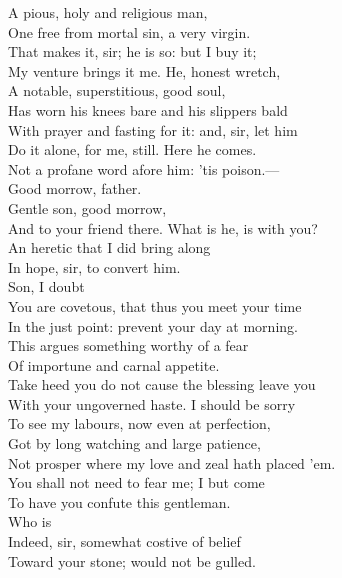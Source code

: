 \documentclass[a4paper,oneside,12pt]{memoir}
\begin{document}
\begin{drama*}
A pious, holy and religious man,\\
One free from mortal sin, a very virgin.\\
\mammonspeaks That makes it, sir; he is so: but I buy it;\\
My venture brings it me. He, honest wretch,\\
A notable, superstitious, good soul,\\
Has worn his knees bare and his slippers bald\\
With prayer and fasting for it: and, sir, let him\\
Do it alone, for me, still. Here he comes.\\
Not a profane word afore him: 'tis poison.---\\
Good morrow, father.\\
\subtlespeaks {} Gentle son, good morrow,\\
And to your friend there. What is he, is with you?\\
\mammonspeaks An heretic that I did bring along\\
In hope, sir, to convert him.\\
\subtlespeaks {} Son, I doubt\\
You are covetous, that thus you meet your time\\
In the just point: prevent your day at morning.\\
This argues something worthy of a fear\\
Of importune and carnal appetite.\\
Take heed you do not cause the blessing leave you\\
With your ungoverned haste. I should be sorry\\
To see my labours, now even at perfection,\\
Got by long watching and large patience,\\
Not prosper where my love and zeal hath placed 'em.\\
\mammonspeaks You shall not need to fear me; I but come\\
To have you confute this gentleman.\\
\surlyspeaks {} Who is\\
Indeed, sir, somewhat costive of belief\\
Toward your stone; would not be gulled.\\

\end{drama*}
\end{document}
